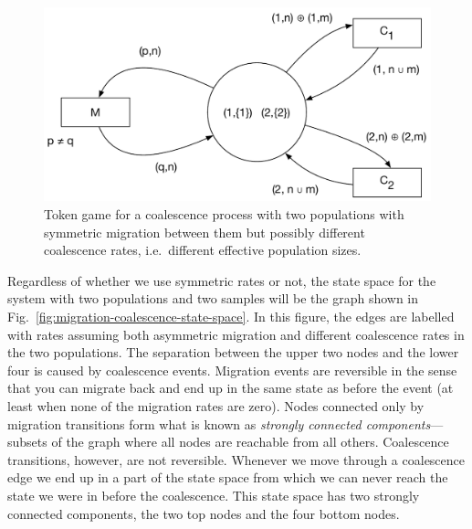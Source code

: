 \documentclass[graybox]{svmult}
\begin{document}
\begin{figure}[h]
\sidecaption
\includegraphics[scale=.30]{figures/migration-coalescence-CPN-2}
\caption{Token game for a coalescence process with two populations with symmetric migration between them but possibly different coalescence rates, i.e.\ different effective population sizes.}
\label{fig:migration-coalescence-CPN-2}
\end{figure}

Regardless of whether we use symmetric rates or not, the state space for the system with two populations and two samples will be the graph shown in Fig.~\ref{fig:migration-coalescence-state-space}. In this figure, the edges are labelled with rates assuming both asymmetric migration and different coalescence rates in the two populations. The separation between the upper two nodes and the lower four is caused by coalescence events. Migration events are reversible in the sense that you can migrate back and end up in the same state as before the event (at least when none of the migration rates are zero). Nodes connected only by migration transitions form what is known as \emph{strongly connected components}---subsets of the graph where all nodes are reachable from all others. Coalescence transitions, however, are not reversible. Whenever we move through a coalescence edge we end up in a part of the state space from which we can never reach the state we were in before the coalescence. This state space has two strongly connected components, the two top nodes and the four bottom nodes.
\end{document}

